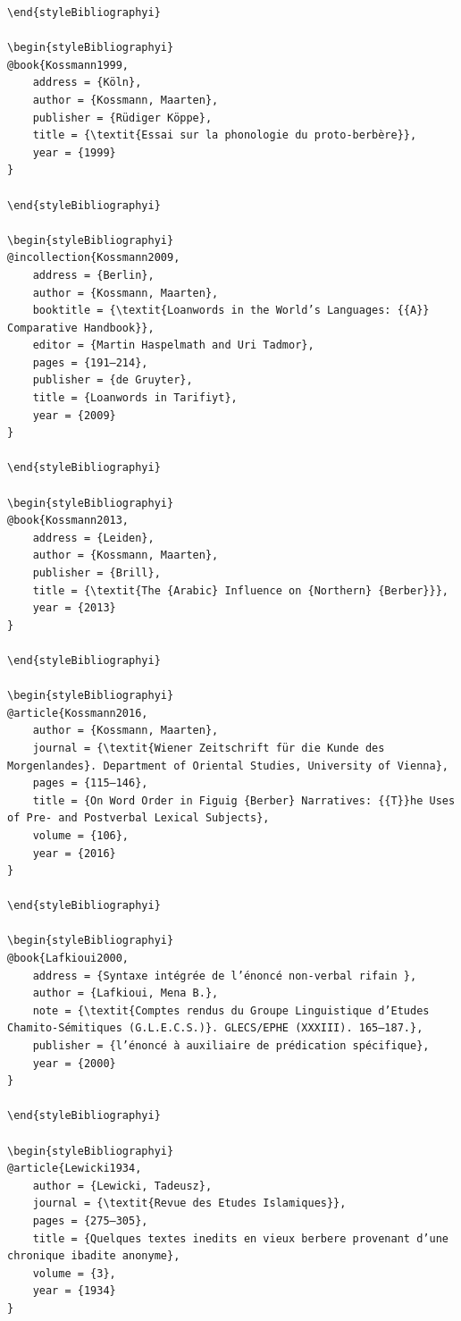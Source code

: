 \documentclass[output=paper]{langscibook}
\begin{document}
\begin{verbatim}
\end{styleBibliographyi}

\begin{styleBibliographyi}
@book{Kossmann1999,
	address = {Köln},
	author = {Kossmann, Maarten},
	publisher = {Rüdiger Köppe},
	title = {\textit{Essai sur la phonologie du proto-berbère}},
	year = {1999}
}

\end{styleBibliographyi}

\begin{styleBibliographyi}
@incollection{Kossmann2009,
	address = {Berlin},
	author = {Kossmann, Maarten},
	booktitle = {\textit{Loanwords in the World’s Languages: {{A}} Comparative Handbook}},
	editor = {Martin Haspelmath and Uri Tadmor},
	pages = {191–214},
	publisher = {de Gruyter},
	title = {Loanwords in Tarifiyt},
	year = {2009}
}

\end{styleBibliographyi}

\begin{styleBibliographyi}
@book{Kossmann2013,
	address = {Leiden},
	author = {Kossmann, Maarten},
	publisher = {Brill},
	title = {\textit{The {Arabic} Influence on {Northern} {Berber}}},
	year = {2013}
}

\end{styleBibliographyi}

\begin{styleBibliographyi}
@article{Kossmann2016,
	author = {Kossmann, Maarten},
	journal = {\textit{Wiener Zeitschrift für die Kunde des Morgenlandes}. Department of Oriental Studies, University of Vienna},
	pages = {115–146},
	title = {On Word Order in Figuig {Berber} Narratives: {{T}}he Uses of Pre- and Postverbal Lexical Subjects},
	volume = {106},
	year = {2016}
}

\end{styleBibliographyi}

\begin{styleBibliographyi}
@book{Lafkioui2000,
	address = {Syntaxe intégrée de l’énoncé non-verbal rifain },
	author = {Lafkioui, Mena B.},
	note = {\textit{Comptes rendus du Groupe Linguistique d’Etudes Chamito-Sémitiques (G.L.E.C.S.)}. GLECS/EPHE (XXXIII). 165–187.},
	publisher = {l’énoncé à auxiliaire de prédication spécifique},
	year = {2000}
}

\end{styleBibliographyi}

\begin{styleBibliographyi}
@article{Lewicki1934,
	author = {Lewicki, Tadeusz},
	journal = {\textit{Revue des Etudes Islamiques}},
	pages = {275–305},
	title = {Quelques textes inedits en vieux berbere provenant d’une chronique ibadite anonyme},
	volume = {3},
	year = {1934}
}


\end{verbatim}
\end{document}
